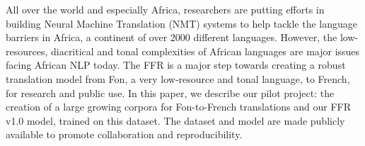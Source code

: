 All over the world and especially Africa, researchers are putting efforts in building Neural Machine Translation (NMT) systems to help tackle the language barriers in Africa, a continent of over 2000 different languages. However, the low-resources, diacritical and tonal complexities of African languages are major issues facing African NLP today. The FFR is a major step towards creating a robust translation model from Fon, a very low-resource and tonal language, to French, for research and public use. In this paper, we describe our pilot project: the creation of a large growing corpora for Fon-to-French translations and our FFR v1.0 model, trained on this dataset. The dataset and model are made publicly available to promote collaboration and reproducibility.

